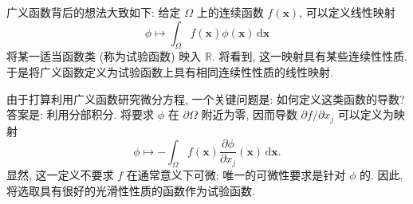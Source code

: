 广义函数背后的想法大致如下: 给定 $\Omega$ 上的连续函数 $f(\bm{x})$, 可以定义线性映射
\begin{equation}\label{eq:function-induced-test-functional}
\phi\mapsto\int_\Omega f(\bm{x})\phi(\bm{x})\,\mathrm{d}\bm{x}
\end{equation}
将某一适当函数类 (称为试验函数) 映入 $\mathbb{R}$. 将看到, 这一映射具有某些连续性性质. 于是将广义函数定义为试验函数上具有相同连续性性质的线性映射.

由于打算利用广义函数研究微分方程, 一个关键问题是: 如何定义这类函数的导数? 答案是: 利用分部积分. 将要求 $\phi$ 在 $\partial\Omega$ 附近为零, 因而导数 $\partial f/\partial x_j$ 可以定义为映射
\begin{equation}\label{eq:distribution-derivative-motivating-pairing}
\phi\mapsto-\int_\Omega f(\bm{x})\dfrac{\partial\phi}{\partial x_j}(\bm{x})\,\mathrm{d}\bm{x}.
\end{equation}
显然, 这一定义不要求 $f$ 在通常意义下可微; 唯一的可微性要求是针对 $\phi$ 的. 因此, 将选取具有很好的光滑性性质的函数作为试验函数.
